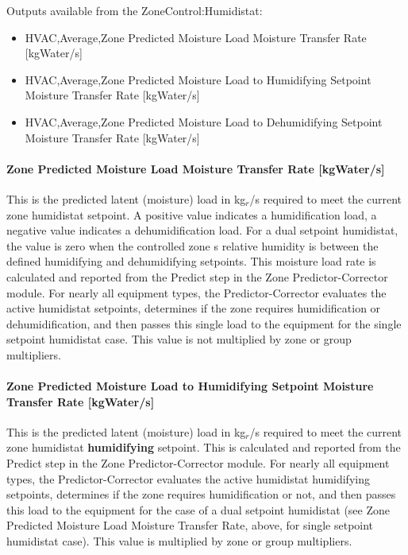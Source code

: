 Outputs available from the ZoneControl:Humidistat:

\begin{itemize}
\item
  HVAC,Average,Zone Predicted Moisture Load Moisture Transfer Rate {[}kgWater/s{]}
\item
  HVAC,Average,Zone Predicted Moisture Load to Humidifying Setpoint Moisture Transfer Rate {[}kgWater/s{]}
\item
  HVAC,Average,Zone Predicted Moisture Load to Dehumidifying Setpoint Moisture Transfer Rate {[}kgWater/s{]}
\end{itemize}

\paragraph{Zone Predicted Moisture Load Moisture Transfer Rate {[}kgWater/s{]}}\label{zone-predicted-moisture-load-moisture-transfer-rate-kgwaters}

This is the predicted latent (moisture) load in kg\(_{r}\)/s required to meet the current zone humidistat setpoint. A positive value indicates a humidification load, a negative value indicates a dehumidification load. For a dual setpoint humidistat, the value is zero when the controlled zone s relative humidity is between the defined humidifying and dehumidifying setpoints. This moisture load rate is calculated and reported from the Predict step in the Zone Predictor-Corrector module. For nearly all equipment types, the Predictor-Corrector evaluates the active humidistat setpoints, determines if the zone requires humidification or dehumidification, and then passes this single load to the equipment for the single setpoint humidistat case. This value is not multiplied by zone or group multipliers.

\paragraph{Zone Predicted Moisture Load to Humidifying Setpoint Moisture Transfer Rate {[}kgWater/s{]}}\label{zone-predicted-moisture-load-to-humidifying-setpoint-moisture-transfer-rate-kgwaters}

This is the predicted latent (moisture) load in kg\(_{r}\)/s required to meet the current zone humidistat \textbf{humidifying} setpoint. This is calculated and reported from the Predict step in the Zone Predictor-Corrector module. For nearly all equipment types, the Predictor-Corrector evaluates the active humidistat humidifying setpoints, determines if the zone requires humidification or not, and then passes this load to the equipment for the case of a dual setpoint humidistat (see Zone Predicted Moisture Load Moisture Transfer Rate, above, for single setpoint humidistat case). This value is multiplied by zone or group multipliers.

